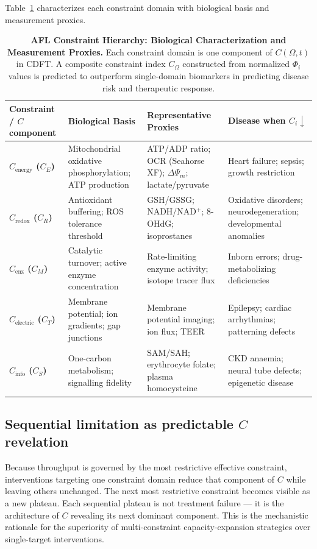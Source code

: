 \documentclass[12pt,a4paper]{article}
\newcommand{\Om}{\Omega}
\begin{document}
Table~\ref{tab:hierarchy_proxies} characterizes each constraint domain with biological basis and measurement proxies.

\begin{table}[H]
\centering
\caption{\textbf{AFL Constraint Hierarchy: Biological Characterization and Measurement Proxies.}
Each constraint domain is one component of $C(\Om,t)$ in CDFT. A composite
constraint index $C_\Om$ constructed from normalized $\Phi_i$ values is predicted to
outperform single-domain biomarkers in predicting disease risk and therapeutic response.}
\label{tab:hierarchy_proxies}
\small
\setlength{\tabcolsep}{4pt}
\begin{tabularx}{\linewidth}{>{\bfseries}lXXX}
\toprule
Constraint / $C$ component & Biological Basis & Representative Proxies & Disease when $C_i \downarrow$ \\
\midrule
$C_{\mathrm{energy}}$ ($C_E$) & Mitochondrial oxidative phosphorylation; ATP production & ATP/ADP ratio; OCR (Seahorse XF); $\Delta\Psi_m$; lactate/pyruvate & Heart failure; sepsis; growth restriction \\[2pt]
$C_{\mathrm{redox}}$ ($C_R$) & Antioxidant buffering; ROS tolerance threshold & GSH/GSSG; NADH/NAD$^+$; 8-OHdG; isoprostanes & Oxidative disorders; neurodegeneration; developmental anomalies \\[2pt]
$C_{\mathrm{enz}}$ ($C_M$) & Catalytic turnover; active enzyme concentration & Rate-limiting enzyme activity; isotope tracer flux & Inborn errors; drug-metabolizing deficiencies \\[2pt]
$C_{\mathrm{electric}}$ ($C_T$) & Membrane potential; ion gradients; gap junctions & Membrane potential imaging; ion flux; TEER & Epilepsy; cardiac arrhythmias; patterning defects \\[2pt]
$C_{\mathrm{info}}$ ($C_S$) & One-carbon metabolism; signalling fidelity & SAM/SAH; erythrocyte folate; plasma homocysteine & CKD anaemia; neural tube defects; epigenetic disease \\
\bottomrule
\end{tabularx}
\end{table}

\subsection{Sequential limitation as predictable $C$ revelation}

Because throughput is governed by the most restrictive effective constraint, interventions targeting one constraint domain reduce that component of $C$ while leaving others unchanged. The next most restrictive constraint becomes visible as a new plateau. Each sequential plateau is not treatment failure --- it is the architecture of $C$ revealing its next dominant component. This is the mechanistic rationale for the superiority of multi-constraint capacity-expansion strategies over single-target interventions.
\end{document}
